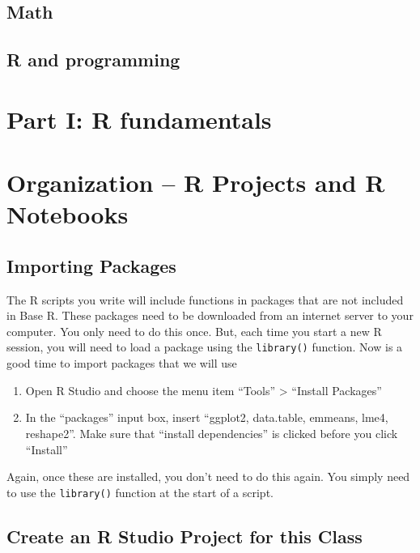 \documentclass[]{book}
\providecommand{\tightlist}{%
  \setlength{\itemsep}{0pt}\setlength{\parskip}{0pt}}
\begin{document}
\section{Math}\label{math}

\section{R and programming}\label{r-and-programming}

\chapter*{Part I: R fundamentals}\label{part-i-r-fundamentals}

\chapter{Organization -- R Projects and R
Notebooks}\label{organization-r-projects-and-r-notebooks}

\section{Importing Packages}\label{importing-packages}

The R scripts you write will include functions in packages that are not
included in Base R. These packages need to be downloaded from an
internet server to your computer. You only need to do this once. But,
each time you start a new R session, you will need to load a package
using the \texttt{library()} function. Now is a good time to import
packages that we will use

\begin{enumerate}
\def\labelenumi{\arabic{enumi}.}
\tightlist
\item
  Open R Studio and choose the menu item ``Tools'' \textgreater{}
  ``Install Packages''
\item
  In the ``packages'' input box, insert ``ggplot2, data.table, emmeans,
  lme4, reshape2''. Make sure that ``install dependencies'' is clicked
  before you click ``Install''
\end{enumerate}

Again, once these are installed, you don't need to do this again. You
simply need to use the \texttt{library()} function at the start of a
script.

\section{Create an R Studio Project for this
Class}\label{create-an-r-studio-project-for-this-class}
\end{document}
